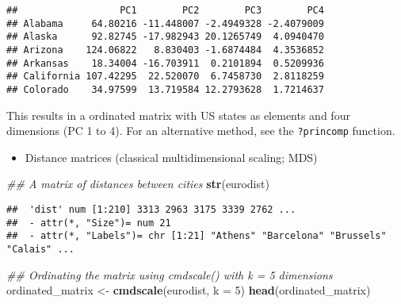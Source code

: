\documentclass[
]{book}
\newenvironment{Shaded}{\begin{snugshade}}{\end{snugshade}}
\newcommand{\CommentTok}[1]{\textcolor[rgb]{0.56,0.35,0.01}{\textit{#1}}}
\newcommand{\DataTypeTok}[1]{\textcolor[rgb]{0.13,0.29,0.53}{#1}}
\newcommand{\DecValTok}[1]{\textcolor[rgb]{0.00,0.00,0.81}{#1}}
\newcommand{\KeywordTok}[1]{\textcolor[rgb]{0.13,0.29,0.53}{\textbf{#1}}}
\newcommand{\NormalTok}[1]{#1}
\newcommand{\OperatorTok}[1]{\textcolor[rgb]{0.81,0.36,0.00}{\textbf{#1}}}
\newcommand{\StringTok}[1]{\textcolor[rgb]{0.31,0.60,0.02}{#1}}
\providecommand{\tightlist}{%
  \setlength{\itemsep}{0pt}\setlength{\parskip}{0pt}}
\begin{document}
\begin{Shaded}
\end{Shaded}

\begin{verbatim}
##                  PC1        PC2        PC3        PC4
## Alabama     64.80216 -11.448007 -2.4949328 -2.4079009
## Alaska      92.82745 -17.982943 20.1265749  4.0940470
## Arizona    124.06822   8.830403 -1.6874484  4.3536852
## Arkansas    18.34004 -16.703911  0.2101894  0.5209936
## California 107.42295  22.520070  6.7458730  2.8118259
## Colorado    34.97599  13.719584 12.2793628  1.7214637
\end{verbatim}

This results in a ordinated matrix with US states as elements and four dimensions (PC 1 to 4). For an alternative method, see the \texttt{?princomp} function.

\begin{itemize}
\tightlist
\item
  Distance matrices (classical multidimensional scaling; MDS)
\end{itemize}

\begin{Shaded}
\begin{Highlighting}[]
\CommentTok{\#\# A matrix of distances between cities}
\KeywordTok{str}\NormalTok{(eurodist)}
\end{Highlighting}
\end{Shaded}

\begin{verbatim}
##  'dist' num [1:210] 3313 2963 3175 3339 2762 ...
##  - attr(*, "Size")= num 21
##  - attr(*, "Labels")= chr [1:21] "Athens" "Barcelona" "Brussels" "Calais" ...
\end{verbatim}

\begin{Shaded}
\begin{Highlighting}[]
\CommentTok{\#\# Ordinating the matrix using cmdscale() with k = 5 dimensions }
\NormalTok{ordinated\_matrix \textless{}{-}}\StringTok{ }\KeywordTok{cmdscale}\NormalTok{(eurodist, }\DataTypeTok{k =} \DecValTok{5}\NormalTok{)}
\KeywordTok{head}\NormalTok{(ordinated\_matrix)}
\end{Highlighting}
\end{Shaded}
\end{document}
